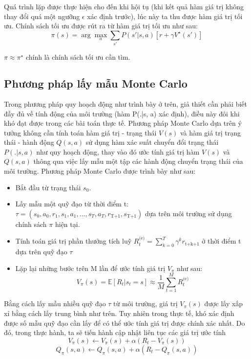 \documentclass{uetgraduation}
\begin{document}
Quá trình lặp được thực hiện cho đến khi hội tụ (khi kết quả hàm giá trị không thay đổi quá một ngưỡng $\epsilon$ xác định trước), lúc này ta thu được hàm giá trị
tối ưu. Chính sách tối ưu được rút ra từ hàm giá trị tối ưu như sau:
\begin{equation}
    \pi (s) = \arg \max_a \sum_{s'} P(s'|s, a) [r + \gamma V^\star (s')]
\end{equation}

$\pi \approx \pi^\star$ chính là chính sách tối ưu cần tìm.

\subsection{Phương pháp lấy mẫu Monte Carlo}
Trong phương pháp quy hoạch động như trình bày ở trên, giả thiết cần phải biết đầy đủ về tính động của môi trường (hàm P(.|s, a) xác định), điều này đôi khi khó đạt được
trong các bài toán thực tế. Phương pháp Monte Carlo dựa trên ý tưởng không cần tính toán hàm giá trị - trạng thái $V(s)$ và hàm giá trị trạng thái - hành động
$Q(s,a)$ sử dụng hàm xác suất chuyển đổi trạng thái $P(.|s, a)$ như quy hoạch động, thay vào đó ước tính giá trị hàm $V(s)$ và $Q(s,a)$ thông qua việc lấy mẫu
một tập các hành động chuyển trạng thái của môi trường. Phương pháp Monte Carlo được trình bày như sau:
\begin{itemize}
    \item Bắt đầu từ trạng thái $s_0$.
    \item Lấy mẫu một quỹ đạo từ thời điểm t: $\tau = (s_0, a_0, r_1, s_1, a_1, \dots, s_T, a_T, r_\text{T+1}, s_\text{T+1})$ dựa trên môi trường sử dụng chính
    sách $\pi$ hiện tại.
    \item Tính toán giá trị phần thưởng tích luỹ $R_t^\text{(e)} = \sum_{k=0}^{T} \gamma^k r_\text{t+k+1}$ ở thời điểm t dựa trên quỹ đạo $\tau$
    \item Lặp lại những bước trên M lần để ước tính giá trị $V_\pi$ như sau:
    \begin{equation}
        V_\pi (s) = \mathbb{E} [R_t | s_t = s] \approx \frac{1}{M} \sum_{t=1}^{M} R_t^\text{(e)}
    \end{equation}
\end{itemize}

Bằng cách lấy mẫu nhiều quỹ đạo $\tau$ từ môi trường, giá trị $V_\pi (s)$ được lấy xấp xỉ bằng cách lấy trung bình như trên. Tuy nhiên trong thực tế, khó xác
định được số mẫu quỹ đạo cần lấy để có thể ước tính giá trị được chính xác nhất. Do đó, trong thực hành, ta sẽ tiến hành cập nhật liên tục các giá trị ước tính
\begin{equation}
    V_\pi (s) \leftarrow V_\pi (s) + \alpha (R_t - V_\pi (s))
\end{equation}
\begin{equation}
    Q_\pi (s, a) \leftarrow Q_\pi (s, a) + \alpha (R_t - Q_\pi (s, a))
\end{equation}
\end{document}
